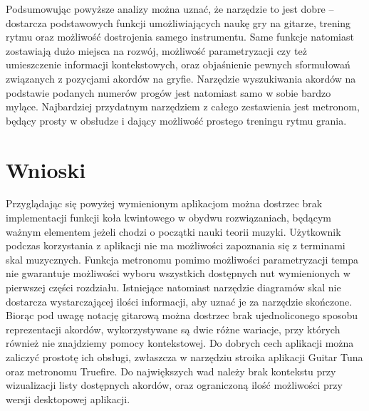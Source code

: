 Podsumowując powyższe analizy można uznać, że narzędzie to jest dobre -- dostarcza podstawowych funkcji umożliwiających naukę gry na gitarze, trening rytmu oraz możliwość dostrojenia samego instrumentu. Same funkcje natomiast zostawiają dużo miejsca na rozwój, możliwość parametryzacji czy też umieszczenie informacji kontekstowych, oraz objaśnienie pewnych sformułowań związanych z pozycjami akordów na gryfie. Narzędzie wyszukiwania akordów na podstawie podanych numerów progów jest natomiast samo w sobie bardzo mylące. Najbardziej przydatnym narzędziem z całego zestawienia jest metronom, będący prosty w obsłudze i dający możliwość prostego treningu rytmu grania. 

\section{Wnioski}

Przyglądając się powyżej wymienionym aplikacjom można dostrzec brak implementacji funkcji koła kwintowego w obydwu rozwiązaniach, będącym ważnym elementem jeżeli chodzi o początki nauki teorii muzyki. Użytkownik podczas korzystania z aplikacji nie ma możliwości zapoznania się z terminami skal muzycznych. Funkcja metronomu pomimo możliwości parametryzacji tempa nie gwarantuje możliwości wyboru wszystkich dostępnych nut wymienionych w pierwszej części rozdziału. Istniejące natomiast narzędzie diagramów skal nie dostarcza wystarczającej ilości informacji, aby uznać je za narzędzie skończone. Biorąc pod uwagę notację gitarową można dostrzec brak ujednoliconego sposobu reprezentacji akordów, wykorzystywane są dwie różne wariacje, przy których również nie znajdziemy pomocy kontekstowej. Do dobrych cech aplikacji można zaliczyć prostotę ich obsługi, zwłaszcza w narzędziu stroika aplikacji Guitar Tuna oraz metronomu Truefire. Do największych wad należy brak kontekstu przy wizualizacji listy dostępnych akordów, oraz ograniczoną ilość możliwości przy wersji desktopowej aplikacji.


